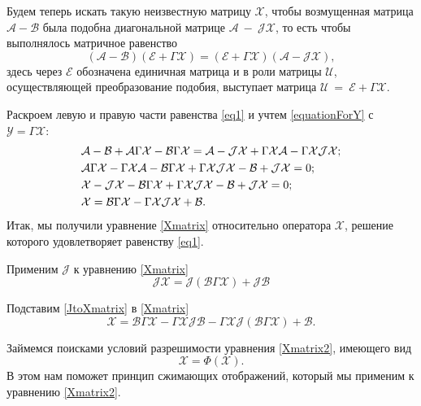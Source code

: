 Будем теперь искать такую неизвестную матрицу $\mathcal{X}$, чтобы возмущенная матрица $\mathcal{A}-\mathcal{B}$ была подобна диагональной матрице $\mathcal{A}~-~\mathcal{J}\mathcal{X}$, то есть чтобы выполнялось матричное равенство
\begin{equation}\label{eq1}
(\mathcal{A}-\mathcal{B})(\mathcal{E}+\Gamma\mathcal{X})=(\mathcal{E}+\Gamma\mathcal{X})(\mathcal{A-JX}),
\end{equation}
здесь через $\mathcal{E}$ обозначена единичная матрица и в роли матрицы $\mathcal{U}$, осуществляющей преобразование подобия, выступает матрица $\mathcal{U}~=~\mathcal{E}+\Gamma\mathcal{X}$.

Раскроем левую и правую части равенства \eqref{eq1} и учтем \eqref{equationForY} с $\mathcal{Y}=\Gamma\mathcal{X}$:
\begin{align}
&\mathcal{A-B}+\mathcal{A}\Gamma\mathcal{X}-\mathcal{B}\Gamma\mathcal{X}=\mathcal{A-JX}+\Gamma\mathcal{X}\mathcal{A}-\Gamma\mathcal{XJX}; \notag \\ 
&\mathcal{A}\Gamma\mathcal{X}-\Gamma\mathcal{XA}-\mathcal{B}\Gamma\mathcal{X}+\Gamma\mathcal{XJX}-\mathcal{B}+\mathcal{JX}=0; \notag \\ 
&\mathcal{X-JX}-\mathcal{B}\Gamma\mathcal{X}+\Gamma\mathcal{XJX}-\mathcal{B}+\mathcal{JX}=0; \notag \\ 
&\mathcal{X}=\mathcal{B}\Gamma\mathcal{X}-\Gamma\mathcal{XJX}+\mathcal{B}. \label{Xmatrix}
\end{align}
Итак, мы получили уравнение \eqref{Xmatrix} относительно оператора $\mathcal{X}$, решение которого удовлетворяет равенству \eqref{eq1}.

Применим $\mathcal{J}$ к уравнению \eqref{Xmatrix}
\begin{equation}\label{JtoXmatrix}
\mathcal{JX}=\mathcal{J}(\mathcal{B}\Gamma\mathcal{X})+\mathcal{JB}
\end{equation}

Подставим \eqref{JtoXmatrix} в \eqref{Xmatrix}
\begin{equation}\label{Xmatrix2}
\mathcal{X}=\mathcal{B}\Gamma\mathcal{X}-\Gamma\mathcal{XJB}-\Gamma\mathcal{XJ}(\mathcal{B}\Gamma\mathcal{X})+\mathcal{B}.
\end{equation}

Займемся поисками условий разрешимости уравнения \eqref{Xmatrix2}, имеющего вид
\begin{equation}\label{Xmatrix3}
\mathcal{X}=\Phi(\mathcal{X}).
\end{equation}
В этом нам поможет принцип сжимающих отображений, который мы применим к уравнению \eqref{Xmatrix2}.

